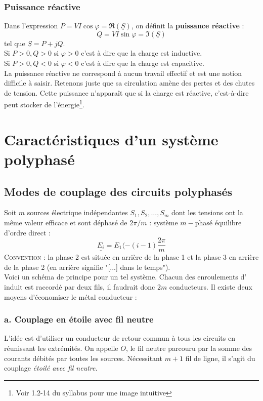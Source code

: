 		\subsubsection{Puissance réactive}
		Dans l'expression $P = VI \cos\varphi = \Re(\underline{S})$, on définit la 
		\textbf{puissance réactive} :
		\begin{equation}
		Q = VI\sin\varphi = \Im(\underline{S})
		\end{equation}
		tel que $\underline{S} = P+jQ$.\\
		Si $P>0, Q>0$ si $\varphi>0$ c'est à dire que la charge est inductive.\\
		Si $P>0, Q<0$ si $\varphi<0$ c'est à dire que la charge est capacitive.\\
			
		La puissance réactive ne correspond à aucun travail effectif et est une 
		notion difficile à saisir. Retenons juste que sa circulation amène des 
		pertes et des chutes de tension. Cette puissance n'apparaît que si la 
		charge est réactive, c'est-à-dire peut stocker de l'énergie\footnote{Voir 
		1.2-14 du syllabus pour une image intuitive}.
		
\section{Caractéristiques d'un système polyphasé}
	\subsection{Modes de couplage des circuits polyphasés}
	Soit $m$ sources électrique indépendantes $S_1, S_2,\dots,S_m$ dont les tensions 
	ont la même valeur efficace et sont déphasé de $2\pi/m$ : système $m-$phasé 
	équilibre d'ordre direct :
	\begin{equation}
	\underline{E_i} = E_{1} \langle -(i-1)\frac{2\pi}{m}
	\end{equation}
	\textsc{Convention :} la phase 2 est située en arrière de la phase 1 et la 
	phase 3 en arrière de la phase 2 (en arrière signifie "[...] dans le temps").\\
	
	Voici un schéma de principe pour un tel système. Chacun des enroulements d'
	induit est raccordé par deux fils, il faudrait donc $2m$ conducteurs. Il existe 
	deux moyens d'économiser le métal conducteur :
	
		\subsubsection{a. Couplage en étoile avec fil neutre}
		L'idée est d'utiliser un conducteur de retour commun à tous les circuits 
		en réunissant les extrémités. On appelle $O$, le fil neutre parcouru par 
		la somme des courants débités par toutes les sources. Nécessitant $m+1$ 
		fil de ligne, il s'agit du couplage \textit{étoilé avec fil neutre}.\\
		
